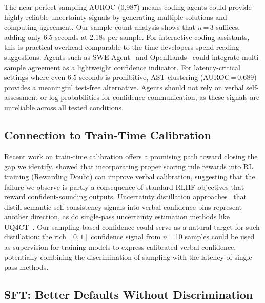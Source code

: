 \documentclass{article}
\begin{document}
The near-perfect sampling AUROC (0.987) means coding agents could provide highly reliable uncertainty signals by generating multiple solutions and computing agreement. Our sample count analysis shows that $n$\,=\,3 suffices, adding only 6.5 seconds at 2.18s per sample. For interactive coding assistants, this is practical overhead comparable to the time developers spend reading suggestions. Agents such as SWE-Agent~\citep{yang2024swe} and OpenHands~\citep{wang2024opendevin} could integrate multi-sample agreement as a lightweight confidence indicator. For latency-critical settings where even 6.5 seconds is prohibitive, AST clustering (AUROC\,=\,0.689) provides a meaningful test-free alternative. Agents should not rely on verbal self-assessment or log-probabilities for confidence communication, as these signals are unreliable across all tested conditions.

\subsection{Connection to Train-Time Calibration}
\label{sec:traintime}

Recent work on train-time calibration offers a promising path toward closing the gap we identify. \citet{stangel2025rewarding} showed that incorporating proper scoring rule rewards into RL training (Rewarding Doubt) can improve verbal calibration, suggesting that the failure we observe is partly a consequence of standard RLHF objectives that reward confident-sounding outputs. Uncertainty distillation approaches~\citep{xiong2024uncertainty} that distill semantic self-consistency signals into verbal confidence bins represent another direction, as do single-pass uncertainty estimation methods like UQ4CT~\citep{yao2024uq4ct}. Our sampling-based confidence could serve as a natural target for such distillation: the rich $[0,1]$ confidence signal from $n$\,=\,10 samples could be used as supervision for training models to express calibrated verbal confidence, potentially combining the discrimination of sampling with the latency of single-pass methods.

\subsection{SFT: Better Defaults Without Discrimination}
\label{sec:sft_disc}
\end{document}
